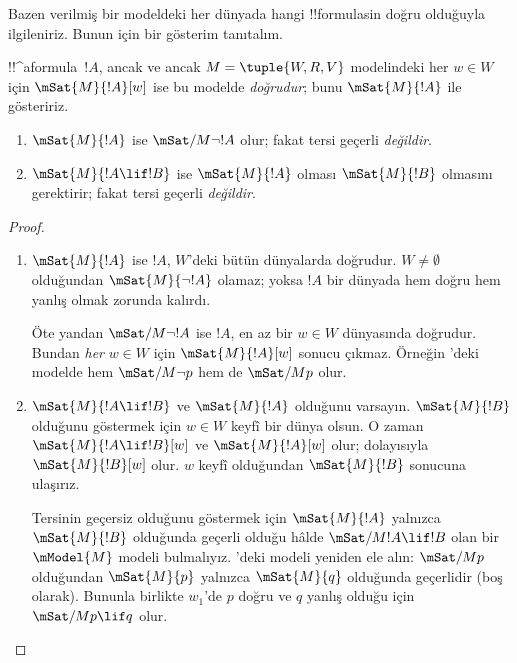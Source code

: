 



Bazen verilmiş bir modeldeki her dünyada hangi !!{formula}s{}in doğru olduğuyla
ilgileniriz. Bunun için bir gösterim tanıtalım.

\begin{defn}
  !!^a{formula}~$!A$, ancak ve ancak $M = \tuple{W, R, V}$ modelindeki her
  $w \in W$ için $\mSat{M}{!A}[w]$ ise bu modelde \emph{doğrudur}; bunu
  $\mSat{M}{!A}$ ile gösteririz.
\end{defn}

\begin{prop}
  \begin{enumerate}
  \item $\mSat{M}{!A}$ ise $\mSat/{M}{\lnot !A}$ olur; fakat tersi geçerli
    \emph{değildir}.
  \item $\mSat{M}{!A \lif !B}$ ise $\mSat{M}{!A}$ olması
    $\mSat{M}{!B}$ olmasını gerektirir; fakat tersi geçerli \emph{değildir}.
  \end{enumerate}
\end{prop}

\begin{proof}
  \begin{enumerate}
  \item $\mSat{M}{!A}$ ise $!A$, $W$'deki bütün dünyalarda doğrudur.
    $W \neq \emptyset$ olduğundan $\mSat{M}{\lnot!A}$ olamaz; yoksa $!A$
    bir dünyada hem doğru hem yanlış olmak zorunda kalırdı.

    Öte yandan $\mSat/{M}{\lnot !A}$ ise $!A$, en az bir $w \in W$
    dünyasında doğrudur. Bundan \emph{her} $w \in W$ için
    $\mSat{M}{!A}[w]$ sonucu
    çıkmaz. Örneğin 'deki modelde hem
    $\mSat/{M}{\lnot p}$ hem de $\mSat/{M}{p}$ olur.
  \item $\mSat{M}{!A \lif !B}$ ve $\mSat{M}{!A}$ olduğunu varsayın.
    $\mSat{M}{!B}$ olduğunu göstermek için $w \in W$ keyfî bir dünya olsun.
    O zaman $\mSat{M}{!A \lif !B}[w]$ ve $\mSat{M}{!A}[w]$ olur; dolayısıyla
    $\mSat{M}{!B}[w]$ olur. $w$ keyfî olduğundan $\mSat{M}{!B}$ sonucuna
    ulaşırız.

    Tersinin geçersiz olduğunu göstermek için $\mSat{M}{!A}$ yalnızca
    $\mSat{M}{!B}$ olduğunda geçerli olduğu hâlde
    $\mSat/{M}{!A \lif !B}$ olan bir $\mModel{M}$ modeli bulmalıyız.
    'deki modeli yeniden ele alın: $\mSat/{M}{p}$
    olduğundan $\mSat{M}{p}$ yalnızca $\mSat{M}{q}$ olduğunda geçerlidir
    (boş olarak). Bununla birlikte $w_1$'de $p$ doğru ve $q$ yanlış olduğu
    için $\mSat/{M}{p \lif q}$ olur.
  \end{enumerate}
\end{proof}

